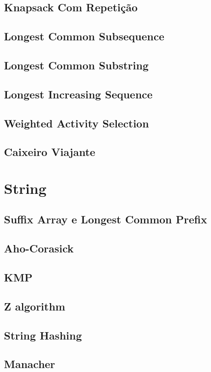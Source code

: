 \documentclass[10pt, letterpaper, twocolumn, twosides]{article}
\begin{document}
\subsection{Knapsack Com Repetição}

\subsection{Longest Common Subsequence}

\subsection{Longest Common Substring}

\subsection{Longest Increasing Sequence}

\subsection{Weighted Activity Selection}

\subsection{Caixeiro Viajante}

\section{String}
\subsection{Suffix Array e Longest Common Prefix}

\subsection{Aho-Corasick}

\subsection{KMP}

\subsection{Z algorithm}

\subsection{String Hashing}

\subsection{Manacher}

\end{document}
